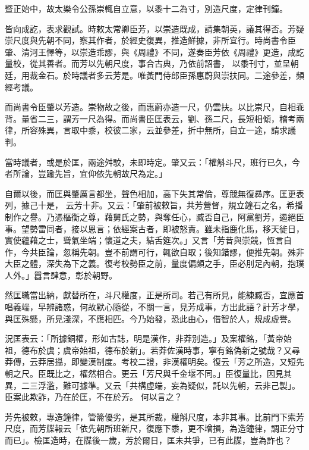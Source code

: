 \begin{pinyinscope}
 暨正始中，故太樂令公孫崇輒自立意，以黍十二為寸，別造尺度，定律刊鐘。



 皆向成訖，表求觀試。時敕太常卿臣芳，以崇造既成，請集朝英，議其得否。芳疑崇尺度與先朝不同，察其作者，於經史復異，推造鮮據，非所宜行。時尚書令臣肇、清河王懌等，以崇造乖謬，與《周禮》不同，遂奏臣芳依《周禮》更造，成訖量校，從其善者。而芳以先朝尺度，事合古典，乃依前詔書，
 以黍刊寸，並呈朝廷，用裁金石。於時議者多云芳是。唯黃門侍郎臣孫惠蔚與崇扶同。二途參差，頻經考議。



 而尚書令臣肇以芳造。崇物故之後，而惠蔚亦造一尺，仍雲扶。以比崇尺，自相乖背。量省二三，謂芳一尺為得。而尚書臣匡表云，劉、孫二尺，長短相傾，稽考兩律，所容殊異，言取中黍，校彼二家，云並參差，折中無所，自立一途，請求議判。



 當時議者，或是於匡，兩途舛駮，未即時定。肇又云：「權斛斗尺，班行已久，今者所論，豈踰先旨，宜仰依先朝故尺為定。」



 自爾以後，而匡與肇厲言都坐，聲色相加，高下失其常倫，尊競無復彞序。匡更表列，據己十是，
 云芳十非。又云：「肇前被敕旨，共芳營督，規立鐘石之名，希播制作之譽。乃憑樞衡之尊，藉舅氏之勢，與奪任心，臧否自己，阿黨劉芳，遏絕臣事。望勢雷同者，接以恩言；依經案古者，即被怒責。雖未指鹿化馬，移天徙日，實使蘊藉之士，聳氣坐端；懷道之夫，結舌筵次。」又言「芳昔與崇競，恆言自作，今共臣論，忽稱先朝。豈不前謂可行，輒欲自取；後知錯謬，便推先朝。殊非大臣之體，深失為下之義。復考校勢臣之前，量度偏頗之手，臣必刖足內朝，抱璞人外。」囂言肆意，彰於朝野。



 然匡職當出納，獻替所在，斗尺權度，正是所司。若己有所見，能練臧否，宜應首
 唱義端，早辨諸惑，何故默心隨從，不關一言，見芳成事，方出此語？計芳才學，與匡殊懸，所見淺深，不應相匹。今乃始發，恐此由心，借智於人，規成虛譽。



 況匡表云：「所據銅權，形如古誌，明是漢作，非莽別造。」及案權銘，「黃帝始祖，德布於虞；虞帝始祖，德布於新」。若莽佐漢時事，寧有銘偽新之號哉？又尋莽傳，云莽居攝，即變漢制度。考校二證，非漢權明矣。復云「芳之所造，又短先朝之尺。臣既比之，權然相合。更云「芳尺與千金堰不同。」臣復量比，因見其異，二三浮濫，難可據準。又云「共構虛端，妄為疑似，託以先朝，云非己製」。臣案此欺詐，乃在於匡，不在於芳。
 何以言之？



 芳先被敕，專造鐘律，管籥優劣，是其所裁，權斛尺度，本非其事。比前門下索芳尺度，而芳牒報云「依先朝所班新尺，復應下黍，更不增損，為造鐘律，調正分寸而已」。檢匡造時，在牒後一歲，芳於爾日，匡未共爭，已有此牒，豈為詐也？




\end{pinyinscope}
